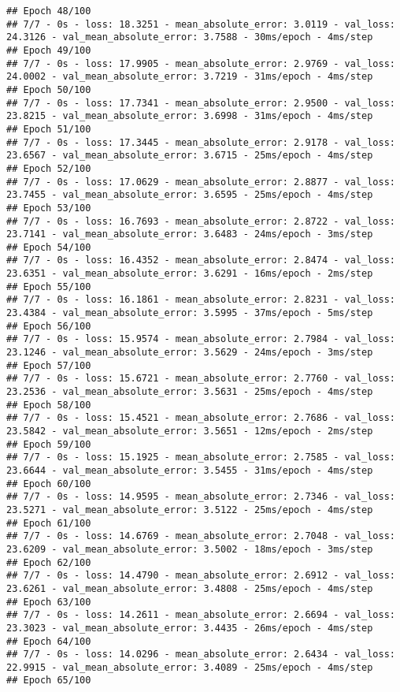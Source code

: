 \documentclass[
]{article}
\begin{document}
\begin{verbatim}
## Epoch 48/100
## 7/7 - 0s - loss: 18.3251 - mean_absolute_error: 3.0119 - val_loss: 24.3126 - val_mean_absolute_error: 3.7588 - 30ms/epoch - 4ms/step
## Epoch 49/100
## 7/7 - 0s - loss: 17.9905 - mean_absolute_error: 2.9769 - val_loss: 24.0002 - val_mean_absolute_error: 3.7219 - 31ms/epoch - 4ms/step
## Epoch 50/100
## 7/7 - 0s - loss: 17.7341 - mean_absolute_error: 2.9500 - val_loss: 23.8215 - val_mean_absolute_error: 3.6998 - 31ms/epoch - 4ms/step
## Epoch 51/100
## 7/7 - 0s - loss: 17.3445 - mean_absolute_error: 2.9178 - val_loss: 23.6567 - val_mean_absolute_error: 3.6715 - 25ms/epoch - 4ms/step
## Epoch 52/100
## 7/7 - 0s - loss: 17.0629 - mean_absolute_error: 2.8877 - val_loss: 23.7455 - val_mean_absolute_error: 3.6595 - 25ms/epoch - 4ms/step
## Epoch 53/100
## 7/7 - 0s - loss: 16.7693 - mean_absolute_error: 2.8722 - val_loss: 23.7141 - val_mean_absolute_error: 3.6483 - 24ms/epoch - 3ms/step
## Epoch 54/100
## 7/7 - 0s - loss: 16.4352 - mean_absolute_error: 2.8474 - val_loss: 23.6351 - val_mean_absolute_error: 3.6291 - 16ms/epoch - 2ms/step
## Epoch 55/100
## 7/7 - 0s - loss: 16.1861 - mean_absolute_error: 2.8231 - val_loss: 23.4384 - val_mean_absolute_error: 3.5995 - 37ms/epoch - 5ms/step
## Epoch 56/100
## 7/7 - 0s - loss: 15.9574 - mean_absolute_error: 2.7984 - val_loss: 23.1246 - val_mean_absolute_error: 3.5629 - 24ms/epoch - 3ms/step
## Epoch 57/100
## 7/7 - 0s - loss: 15.6721 - mean_absolute_error: 2.7760 - val_loss: 23.2536 - val_mean_absolute_error: 3.5631 - 25ms/epoch - 4ms/step
## Epoch 58/100
## 7/7 - 0s - loss: 15.4521 - mean_absolute_error: 2.7686 - val_loss: 23.5842 - val_mean_absolute_error: 3.5651 - 12ms/epoch - 2ms/step
## Epoch 59/100
## 7/7 - 0s - loss: 15.1925 - mean_absolute_error: 2.7585 - val_loss: 23.6644 - val_mean_absolute_error: 3.5455 - 31ms/epoch - 4ms/step
## Epoch 60/100
## 7/7 - 0s - loss: 14.9595 - mean_absolute_error: 2.7346 - val_loss: 23.5271 - val_mean_absolute_error: 3.5122 - 25ms/epoch - 4ms/step
## Epoch 61/100
## 7/7 - 0s - loss: 14.6769 - mean_absolute_error: 2.7048 - val_loss: 23.6209 - val_mean_absolute_error: 3.5002 - 18ms/epoch - 3ms/step
## Epoch 62/100
## 7/7 - 0s - loss: 14.4790 - mean_absolute_error: 2.6912 - val_loss: 23.6261 - val_mean_absolute_error: 3.4808 - 25ms/epoch - 4ms/step
## Epoch 63/100
## 7/7 - 0s - loss: 14.2611 - mean_absolute_error: 2.6694 - val_loss: 23.3023 - val_mean_absolute_error: 3.4435 - 26ms/epoch - 4ms/step
## Epoch 64/100
## 7/7 - 0s - loss: 14.0296 - mean_absolute_error: 2.6434 - val_loss: 22.9915 - val_mean_absolute_error: 3.4089 - 25ms/epoch - 4ms/step
## Epoch 65/100

\end{verbatim}
\end{document}
